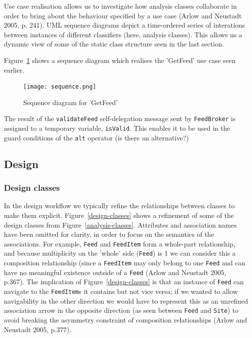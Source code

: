 \documentclass{article}
\begin{document}

Use case realisation allows us to investigate how analysis classes collaborate in order to bring about the behaviour specified by a use case (Arlow and Neustadt 2005, p. 241). UML sequence diagrams depict a time-ordered series of interations between instances of different classifiers (here, analysis classes). This allows us a dynamic view of some of the static class structure seen in the last section.

Figure~\ref{sequence-diagram} shows a sequence diagram which realises the 'GetFeed' use case seen earlier.

\begin{figure}
  \begin{center}
    \texttt{[image: sequence.png]}
  \end{center}
  \label{sequence-diagram}
  \caption{Sequence diagram for 'GetFeed'}
\end{figure}

The result of the \texttt{validateFeed} self-delegation message sent by \texttt{FeedBroker} is assigned to a temporary variable, \texttt{isValid}. This enables it to be used in the guard conditions of the \texttt{alt} operator (is there an alternative?)

\subsection{Design}

\subsubsection{Design classes}

In the design workflow we typically refine the relationships between classes to make them explicit. Figure~\ref{design-classes} shows a refinement of some of the design classes from Figure~\ref{analysis-classes}. Attributes and association names have been omitted for clarity, in order to focus on the semantics of the associations. For example, \texttt{Feed} and \texttt{FeedItem} form a whole-part relationship, and because multiplicity on the 'whole' side (\texttt{Feed}) is 1 we can consider this a composition relationship (since a \texttt{FeedItem} may only belong to one \texttt{Feed} and can have no meaningful existence outside of a \texttt{Feed} (Arlow and Neustadt 2005, p.367). The implication of Figure~\ref{design-classes} is that an instance of \texttt{Feed} can navigate to the \texttt{FeedItem}s it contains but not vice versa; if we wanted to allow navigability in the other direction we would have to represent this as an unrefined association arrow in the opposite direction (as seen between \texttt{Feed} and \texttt{Site}) to avoid breaking the asymmetry constraint of composition relationships (Arlow and Neustadt 2005, p.377).
\end{document}
